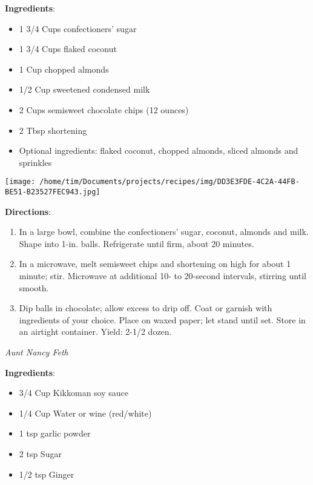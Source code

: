 \documentclass[11pt, twoside, openany]{book}
\begin{document}
\begin{minipage}[t]{0.8\linewidth}
\textbf{Ingredients}:\vspace{-3mm}
\begin{multicols}{2}
\begin{itemize}\setlength\itemsep{-1mm}
\item 1 3/4 Cups confectioners' sugar
\item 1 3/4 Cups flaked coconut
\item 1 Cup chopped almonds
\item 1/2 Cup sweetened condensed milk
\item 2 Cups semisweet chocolate chips (12 ounces)
\item 2 Tbsp shortening
\item Optional ingredients: flaked coconut, chopped almonds, sliced almonds and sprinkles
\end{itemize}
\end{multicols}
\end{minipage}
\begin{minipage}[t]{0.2\linewidth}
\centering \strut\vspace*{-\baselineskip}\newline
\texttt{[image: /home/tim/Documents/projects/recipes/img/DD3E3FDE-4C2A-44FB-BE51-B23527FEC943.jpg]}\\
\end{minipage}\vspace{3mm}
\textbf{Directions}:
\vspace{-3mm}\begin{enumerate}\setlength\itemsep{-1mm}
\item In a large bowl, combine the confectioners' sugar, coconut, almonds and milk. Shape into 1-in. balls. Refrigerate until firm, about 20 minutes. 
\item  In a microwave, melt semisweet chips and shortening on high for about 1 minute; stir. Microwave at additional 10- to 20-second intervals, stirring until smooth. 
\item  Dip balls in chocolate; allow excess to drip off. Coat or garnish with ingredients of your choice. Place on waxed paper; let stand until set. Store in an airtight container. Yield: 2-1/2 dozen.
\end{enumerate}
 \label{marinade-for-meats---steak-teriyaki}\hfill\textit{Aunt Nancy Feth}\\
\begin{minipage}[t]{0.8\linewidth}
\textbf{Ingredients}:\vspace{-3mm}
\begin{multicols}{2}
\begin{itemize}\setlength\itemsep{-1mm}
\item 3/4 Cup Kikkoman soy sauce
\item 1/4 Cup Water or wine (red/white)
\item 1 tsp garlic powder
\item 2 tsp Sugar
\item 1/2 tsp Ginger
\end{itemize}
\end{multicols}
\end{minipage}
\end{document}
